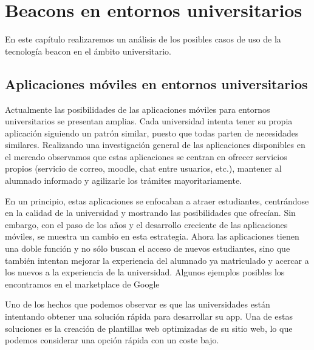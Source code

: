 %
%
%
%


\chapter{Beacons en entornos universitarios} \label{chap:BeaconsEntornosUniversitarios}  


En este capítulo realizaremos un análisis de los posibles casos de uso de la tecnología beacon en el ámbito universitario.

 
\section{Aplicaciones móviles en entornos universitarios}


Actualmente las posibilidades de las aplicaciones móviles para entornos universitarios se presentan amplias.  Cada universidad intenta tener su propia aplicación siguiendo un patrón similar, puesto que todas parten de necesidades similares. Realizando una investigación general de las aplicaciones disponibles en el mercado observamos que estas aplicaciones se centran en ofrecer servicios propios (servicio de correo, moodle, chat entre usuarios, etc.), mantener al alumnado informado y agilizarle los trámites mayoritariamente. 

En un principio, estas aplicaciones se enfocaban a atraer estudiantes, centrándose en la calidad de la universidad y mostrando las posibilidades que ofrecían. Sin embargo, con el paso de los años y el desarrollo creciente de las aplicaciones móviles, se muestra un cambio en esta estrategia. Ahora las aplicaciones tienen una doble función y no sólo buscan el acceso de nuevos estudiantes, sino que también intentan mejorar la experiencia del alumnado ya matriculado y acercar a los nuevos a la experiencia de la universidad. 
Algunos ejemplos posibles los encontramos en el marketplace de Google \cite{URL::galileo, URL::valladolid, URL::oviedo}


Uno de los hechos que podemos observar es que las universidades están intentando obtener una solución rápida para desarrollar su app. Una de estas soluciones es la creación de plantillas web optimizadas de su sitio web, lo que podemos considerar una opción rápida con un coste bajo.


